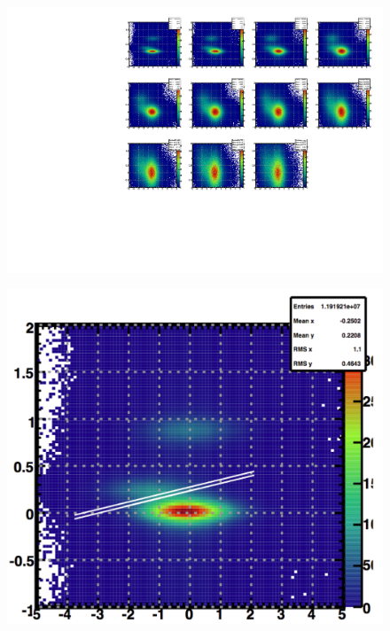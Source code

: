 \documentclass[abstract = on,listof=totoc, bibliography=totoc]{scrreprt}
\begin{document}
\begin{figure}
\begin{center}
\includegraphics[width = 1\textwidth]{TofNSigmaPiPbins_new}
\caption[]{}
\label{fig:tofNSigma}
\end{center}
\end{figure}

\begin{figure}
\begin{center}
\includegraphics[width = 1\textwidth]{tofnsigbiglines}
\caption[]{}
\label{fig:tofnsiglines}
\end{center}
\end{figure}
\end{document}
